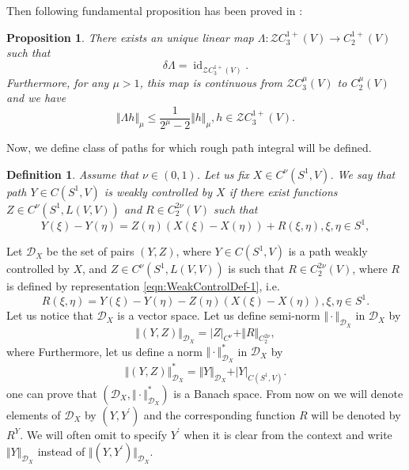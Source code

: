 \documentclass[11pt,a4paper,leqno]{amsart}%
\theoremstyle{plain}
\theoremstyle{remark}
\theoremstyle{plain}
\newtheorem{proposition}[theorem]{Proposition}
\newtheorem{definition}[theorem]{Definition}
\numberwithin{equation}{section}
\newcommand\id{\operatorname{id}}
\def\Rnu{{\mathbb R}}
\begin{document}
Then following fundamental proposition has been proved in
\cite{[Gubinelli-2004]}:
\begin{proposition}
There exists an unique linear map
$\Lambda:\mathcal{Z}C_3^{1+}(V)\to C_2^{1+}(V)$ such that
$$
\delta\Lambda=\id_{\mathcal{Z}C_3^{1+}(V)}.
$$
Furthermore, for any $\mu>1$, this map is continuous from
$\mathcal{Z}C_3^{\mu}(V)$ to $C_2^{\mu}(V)$ and we have
$$
\Vert \Lambda h\Vert_{\mu}\leq
\frac{1}{2^{\mu}-2}\Vert h\Vert_{\mu},h\in\mathcal{Z}C_3^{1+}(V).
$$
\end{proposition}
Now, we define class of paths for which rough path integral will
be defined.
\begin{definition} Assume that $\nu \in (0,1)$. 
Let us fix $X\in C^{\nu}(S^1,V)$. %
We say that path $Y\in C(S^1,V)$ is weakly controlled by $X$ if
there exist functions $Z\in C^{\nu}(S^1,L(V,V))$ and $R\in
C_2^{2\nu}(V)$ such that
\begin{equation}
Y(\xi)-Y(\eta) =Z(\eta)(X(\xi)-X(\eta))+R(\xi,\eta),\xi,\eta\in
S^1,\label{eqn:WeakControlDef-1}
\end{equation}
\end{definition}
Let $\mathcal{D}_X$ be the set of pairs $(Y,Z)$, where $Y\in
C(S^1,V)$ is a path weakly controlled by $X$, and $Z\in
C^{\nu}(S^1,L(V,V))$ is such that $R\in C_2^{2\nu}(V)$, where $R$
is defined by representation \eqref{eqn:WeakControlDef-1}, i.e. 
\begin{equation}
R(\xi,\eta)=Y(\xi)-Y(\eta)-Z(\eta)(X(\xi)-X(\eta)),\xi,\eta\in
S^1.\label{eqn:WeakControlDef-1'}
\end{equation}
Let us notice that $\mathcal{D}_X$ is a vector space. Let us define  semi-norm $\Vert \cdot\Vert_{\mathcal{D}_X}$  in
$\mathcal{D}_X$ by 
\begin{equation}
\Vert (Y,Z)\Vert_{\mathcal{D}_X}=\vert Z\vert_{C^{\nu}}+\Vert R\Vert_{C_2^{2\nu}},\label{eqn:D_XNorm-1}
\end{equation}
where
Furthermore, let us define a  norm $\Vert \cdot\Vert_{\mathcal{D}_X}^\ast$  in
$\mathcal{D}_X$ by 
\begin{equation}
\Vert (Y,Z)\Vert_{\mathcal{D}_X}^\ast=\Vert Y\Vert_{\mathcal{D}_X}+\vert Y\vert_{C(S^1,V)}.\label{eqn:D_XNorm-2}
\end{equation}
one can prove that
$(\mathcal{D}_X,\Vert \cdot\Vert_{\mathcal{D}_X}^\ast)$ is a Banach space.
From now on we will denote elements of $\mathcal{D}_X$ by $(Y,Y^\prime)$
and the corresponding function $R$ will be denoted by $R^Y$. We will often
omit to specify $Y^\prime$ when it is clear from the context and write
$\Vert Y\Vert_{\mathcal{D}_X}$ instead of $\Vert (Y,Y^\prime)\Vert_{\mathcal{D}_X}$.
\end{document}
